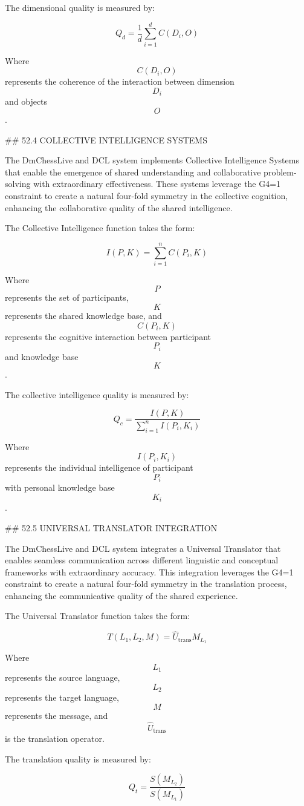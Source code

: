 The dimensional quality is measured by:

$$ Q_d = \frac{1}{d} \sum_{i=1}^{d} C(D_i, O) $$

Where $$ C(D_i, O) $$ represents the coherence of the interaction between dimension $$ D_i $$ and objects $$ O $$.

## 52.4 COLLECTIVE INTELLIGENCE SYSTEMS

The DmChessLive and DCL system implements Collective Intelligence Systems that enable the emergence of shared understanding and collaborative problem-solving with extraordinary effectiveness. These systems leverage the G4=1 constraint to create a natural four-fold symmetry in the collective cognition, enhancing the collaborative quality of the shared intelligence.

The Collective Intelligence function takes the form:

$$ I(P, K) = \sum_{i=1}^{n} C(P_i, K) $$

Where $$ P $$ represents the set of participants, $$ K $$ represents the shared knowledge base, and $$ C(P_i, K) $$ represents the cognitive interaction between participant $$ P_i $$ and knowledge base $$ K $$.

The collective intelligence quality is measured by:

$$ Q_c = \frac{I(P, K)}{\sum_{i=1}^{n} I(P_i, K_i)} $$

Where $$ I(P_i, K_i) $$ represents the individual intelligence of participant $$ P_i $$ with personal knowledge base $$ K_i $$.

## 52.5 UNIVERSAL TRANSLATOR INTEGRATION

The DmChessLive and DCL system integrates a Universal Translator that enables seamless communication across different linguistic and conceptual frameworks with extraordinary accuracy. This integration leverages the G4=1 constraint to create a natural four-fold symmetry in the translation process, enhancing the communicative quality of the shared experience.

The Universal Translator function takes the form:

$$ T(L_1, L_2, M) = \hat{U}_{\text{trans}} M_{L_1} $$

Where $$ L_1 $$ represents the source language, $$ L_2 $$ represents the target language, $$ M $$ represents the message, and $$ \hat{U}_{\text{trans}} $$ is the translation operator.

The translation quality is measured by:

$$ Q_t = \frac{S(M_{L_2})}{S(M_{L_1})} $$

